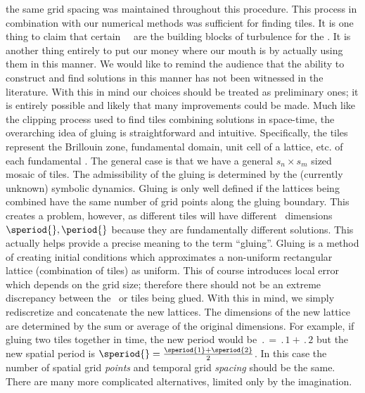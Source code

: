the same grid spacing was maintained throughout this procedure.
This process in combination with our numerical methods was sufficient
for finding tiles.
It is one thing to claim that certain \spt\ \twots\ are the building blocks
of turbulence for the \KSe. It is
another thing entirely to put our money where our mouth is by actually using them in this manner. We would like to remind the audience that the ability to construct and find solutions in this manner
has not been witnessed in the literature. With this in mind our choices should
be treated as preliminary ones; it is entirely possible and likely that
many improvements could be made.
Much like the clipping process used to find tiles combining solutions in space-time,
the overarching idea of gluing is straightforward and intuitive.
Specifically, the tiles represent the
Brillouin zone, fundamental domain, unit cell of a lattice, etc.
of each fundamental \twot.
The general case is that we have a general $s_n \times s_m$ sized mosaic of tiles.
The admissibility of the gluing is determined by the (currently unknown) symbolic
dynamics. Gluing is only well defined if the lattices being combined have the same
number of grid points along the gluing boundary.
This creates a problem, however, as
different tiles will have different \spt\ dimensions $\speriod{},\period{}$ because
they are fundamentally different solutions.
This actually helps provide a precise meaning to the term ``gluing''.
Gluing is a method of creating initial conditions which approximates
a non-uniform rectangular lattice (combination of tiles) as uniform.
This of course introduces local error which depends on the grid size; therefore
there should not be an extreme discrepancy between the \twots\ or tiles being glued.
With this in mind, we simply rediscretize and concatenate the new lattices.
The dimensions of the new lattice are determined by the sum or average of
the original dimensions.
For example, if gluing two tiles together in time, the new period would be
$\period{} = \period{1} + \period{2}$ but the new spatial period is
$\speriod{} = \frac{\speriod{1} + \speriod{2}}{2}$.
In this case the number of spatial grid \emph{points} and temporal grid \emph{spacing}
should be the same. There are many more complicated alternatives, limited only by
the imagination.
